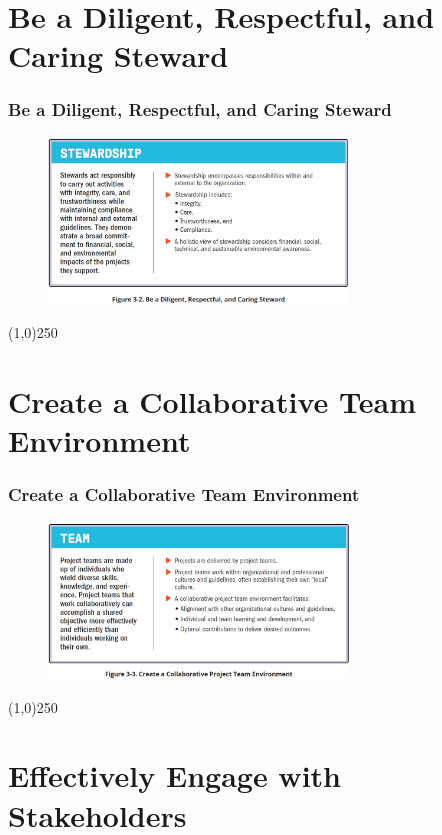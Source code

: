 \section{Be a Diligent, Respectful, and Caring Steward}


\begin{frame}
\frametitle{Be a Diligent, Respectful, and Caring Steward}
 \begin{figure}
    \centering
        \includegraphics[width = 8cm]{../images/standard/Fig3-2.jpg}
    \label{standardfig:3-2}
 \end{figure}
\end{frame}
\begin{center}\line(1,0){250}\end{center}



\section{Create a Collaborative Team Environment}


\begin{frame}
\frametitle{Create a Collaborative Team Environment}
 \begin{figure}
    \centering
        \includegraphics[width = 8cm]{../images/standard/Fig3-3.jpg}
    \label{standardfig:3-3}
 \end{figure}
\end{frame}
\begin{center}\line(1,0){250}\end{center}


\section{Effectively Engage with Stakeholders}


